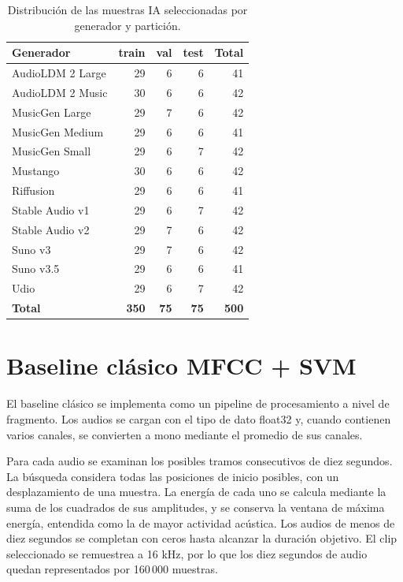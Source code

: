 \begin{table}[H]
    \centering
    \begin{tabular}{lrrrr}
        \hline
        \textbf{Generador} & \textbf{train} & \textbf{val} & \textbf{test} & \textbf{Total} \\
        \hline
        AudioLDM 2 Large & 29 & 6 & 6 & 41 \\
        AudioLDM 2 Music & 30 & 6 & 6 & 42 \\
        MusicGen Large & 29 & 7 & 6 & 42 \\
        MusicGen Medium & 29 & 6 & 6 & 41 \\
        MusicGen Small & 29 & 6 & 7 & 42 \\
        Mustango & 30 & 6 & 6 & 42 \\
        Riffusion & 29 & 6 & 6 & 41 \\
        Stable Audio v1 & 29 & 6 & 7 & 42 \\
        Stable Audio v2 & 29 & 7 & 6 & 42 \\
        Suno v3 & 29 & 7 & 6 & 42 \\
        Suno v3.5 & 29 & 6 & 6 & 41 \\
        Udio & 29 & 6 & 7 & 42 \\
        \hline
        \textbf{Total} & \textbf{350} & \textbf{75} & \textbf{75} & \textbf{500} \\
        \hline
    \end{tabular}
    \caption{Distribución de las muestras IA seleccionadas por generador y partición.}
    \label{tab:aime-generadores-particiones}
\end{table}

\section{Baseline clásico MFCC + SVM}
\label{sec:baseline-mfcc-svm}

El baseline clásico se implementa como un pipeline de procesamiento a nivel de fragmento. Los audios se cargan con el tipo de dato float32 y, cuando contienen varios canales, se convierten a mono mediante el promedio de sus canales.

Para cada audio se examinan los posibles tramos consecutivos de diez segundos. La búsqueda considera todas las posiciones de inicio posibles, con un desplazamiento de una muestra. La energía de cada uno se calcula mediante la suma de los cuadrados de sus amplitudes, y se conserva la ventana de máxima energía, entendida como la de mayor actividad acústica. Los audios de menos de diez segundos se completan con ceros hasta alcanzar la duración objetivo. El clip seleccionado se remuestrea a 16 kHz, por lo que los diez segundos de audio quedan representados por 160\,000 muestras.

